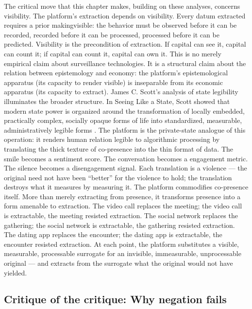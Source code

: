 The critical move that this chapter makes, building on these analyses, concerns visibility. The platform’s extraction depends on visibility. Every datum extracted requires a prior makingvisible: the behavior must be observed before it can be recorded, recorded before it can be processed, processed before it can be predicted. Visibility is the precondition of extraction. If capital can see it, capital can count it; if capital can count it, capital can own it. This is no merely empirical claim about surveillance technologies. It is a structural claim about the relation between epistemology and economy: the platform’s epistemological apparatus (its capacity to render visible) is inseparable from its economic apparatus (its capacity to extract). James C. Scott’s analysis of state legibility illuminates the broader structure. In Seeing Like a State, Scott showed that modern state power is organized around the transformation of locally embedded, practically complex, socially opaque forms of life into standardized, measurable, administratively legible forms \cite{scott_1998}. The platform is the private-state analogue of this operation: it renders human relation legible to algorithmic processing by translating the thick texture of co-presence into the thin format of data. The smile becomes a sentiment score. The conversation becomes a engagement metric. The silence becomes a disengagement signal. Each translation is a violence — the original need not have been “better” for the violence to hold; the translation destroys what it measures by measuring it. The platform commodifies co-presence itself. More than merely extracting from presence, it transforms presence into a form amenable to extraction. The video call replaces the meeting; the video call is extractable, the meeting resisted extraction. The social network replaces the gathering; the social network is extractable, the gathering resisted extraction. The dating app replaces the encounter; the dating app is extractable, the encounter resisted extraction. At each point, the platform substitutes a visible, measurable, processable surrogate for an invisible, immeasurable, unprocessable original — and extracts from the surrogate what the original would not have yielded.

\subsection{Critique of the critique: Why negation fails}

